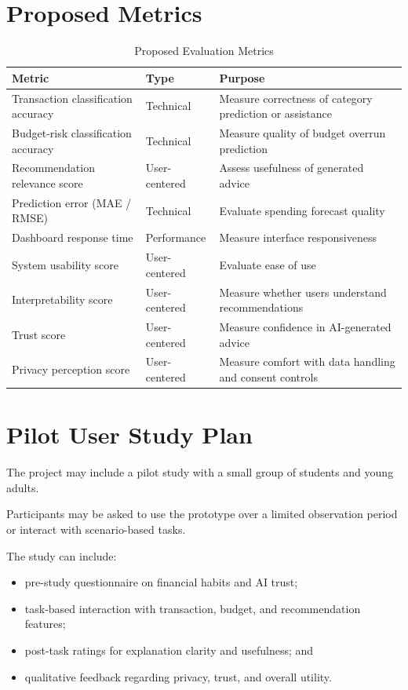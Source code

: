 \documentclass[12pt,a4paper]{report}
\begin{document}
\section{Proposed Metrics}
\begin{table}[H]
\centering
\caption{Proposed Evaluation Metrics}
\label{tab:metrics}
\begin{tabular}{p{4.5cm}p{3.5cm}p{5cm}}
\toprule
\textbf{Metric} & \textbf{Type} & \textbf{Purpose} \\
\midrule
Transaction classification accuracy & Technical & Measure correctness of category prediction or assistance \\
Budget-risk classification accuracy & Technical & Measure quality of budget overrun prediction \\
Recommendation relevance score & User-centered & Assess usefulness of generated advice \\
Prediction error (MAE / RMSE) & Technical & Evaluate spending forecast quality \\
Dashboard response time & Performance & Measure interface responsiveness \\
System usability score & User-centered & Evaluate ease of use \\
Interpretability score & User-centered & Measure whether users understand recommendations \\
Trust score & User-centered & Measure confidence in AI-generated advice \\
Privacy perception score & User-centered & Measure comfort with data handling and consent controls \\
\bottomrule
\end{tabular}
\end{table}

\section{Pilot User Study Plan}
The project may include a pilot study with a small group of students and young adults.

Participants may be asked to use the prototype over a limited observation period or interact with scenario-based tasks.

The study can include:
\begin{itemize}[leftmargin=2em]
\item pre-study questionnaire on financial habits and AI trust;
\item task-based interaction with transaction,
budget,
and recommendation features;
\item post-task ratings for explanation clarity and usefulness;
and
\item qualitative feedback regarding privacy,
trust,
and overall utility.
\end{itemize}
\end{document}
